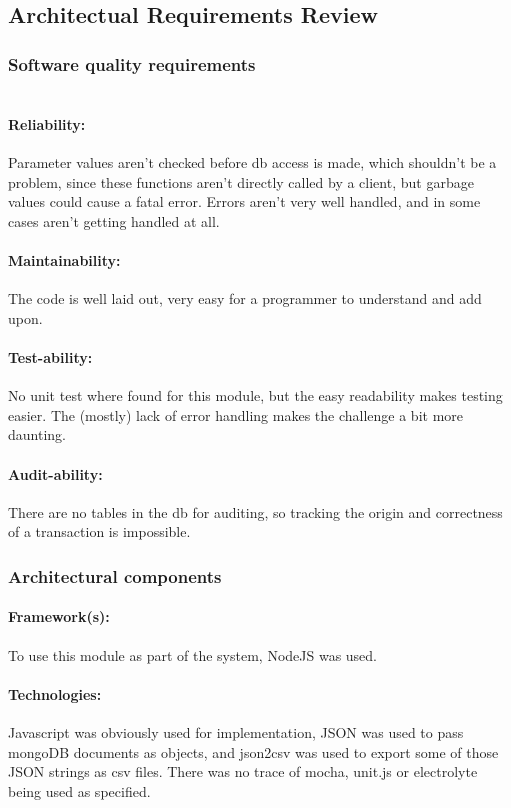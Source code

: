 \subsection{Architectual Requirements Review}

\subsubsection{Software quality requirements} 

\paragraph{\\Reliability:}
Parameter values aren't checked before db access is made, which shouldn't be a problem, since these functions aren't directly called by a client, but garbage values could cause a fatal error. Errors aren't very well handled, and in some cases aren't getting handled at all.
\par
\paragraph{Maintainability:}
The code is well laid out, very easy for a programmer to understand and add upon.
\par
\paragraph{Test-ability:}
 No unit test where found for this module, but the easy readability makes testing easier. The (mostly) lack of error handling makes the challenge a bit more daunting.
\par
\paragraph {Audit-ability:}
There are no tables in the db for auditing, so tracking the origin and correctness of a transaction is impossible.
\\
\par


\subsubsection{Architectural components}
\paragraph {Framework(s):}
 To use this module as part of the system, NodeJS was used.
\par
\paragraph{Technologies:}
 Javascript was obviously used for implementation, JSON was used to pass mongoDB documents as objects, and json2csv was used to export some of those JSON strings as csv files. There was no trace of mocha, unit.js or electrolyte being used as specified.
\par